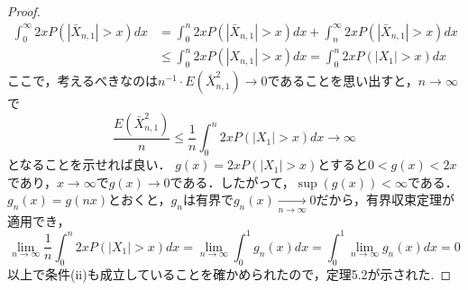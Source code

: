 \documentclass[dvipdfmx]{jsarticle}
\numberwithin{equation}{section}
\theoremstyle{definition}
\newcommand{\0}{\bm{0}}
\newcommand{\1}{\bm{1}}
\begin{document}
\begin{proof}
\begin{align*}
\int_{0}^{\infty}2xP(|\bar{X}_{n,1}|>x)dx &= \int_{0}^{n}2xP(|\bar{X}_{n,1}|>x)dx+\int_{n}^{\infty}2xP(|\bar{X}_{n,1}|>x)dx\\
&\le \int_{0}^{n}2xP(|X_{n,1}|>x)dx=\int_{0}^{n}2xP(|X_1|>x)dx
\end{align*}
ここで，考えるべきなのは$n^{-1}\cdot E(\bar{X}_{n,1}^2) \to 0$であることを思い出すと，$n\to\infty$で
\[
\frac{E(\bar{X}_{n,1}^2)}{n}\le \frac{1}{n}\int_{0}^{n}2xP(|X_1|>x)dx\to\infty
\]
となることを示せれば良い．
$g(x)=2xP(|X_1|>x)$とすると$0<g(x)<2x$であり，$x\to\infty$で$g(x)\to 0$である．したがって，$\sup(g(x))<\infty$である．$g_n(x)=g(nx)$とおくと，$g_n$は有界で$g_n(x)\xrightarrow[n\to\infty]{} 0$だから，有界収束定理が適用でき，
\[
\lim_{n\to\infty}\frac{1}{n}\int_{0}^{n}2xP(|X_1|>x)dx=\lim_{n\to\infty}\int_{0}^{1}g_n(x)dx=\int_{0}^{1}\lim_{n\to\infty}g_n(x)dx=0
\]
以上で条件(ii)も成立していることを確かめられたので，定理5.2が示された.

\end{proof}
\end{document}

